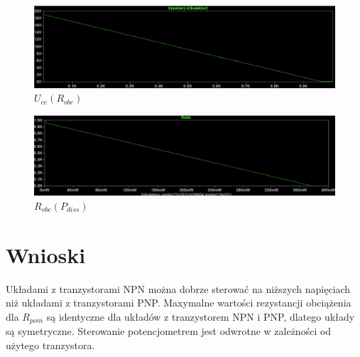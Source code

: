 \documentclass{article}
\begin{document}
\begin{figure}[h!]
    \includegraphics[scale=0.3]{p17.png}
    \centering
    \caption{$U_{ce}(R_{obc})$}
\end{figure}


\begin{figure}[h!]
    \includegraphics[scale=0.3]{p18.png}
    \centering
    \caption{$R_{obc}(P_{diss})$}
\end{figure}

\newpage

\section{Wnioski}

Układami z tranzystorami NPN można dobrze sterować na niższych napięciach niż układami z tranzystorami PNP. Maxymalne wartości rezystancji obciążenia dla $R_{pom}$ są identyczne dla układów z tranzystorem NPN i PNP, dlatego układy są symetryczne. Sterowanie potencjometrem jest odwrotne w zależności od użytego tranzystora.
\end{document}
